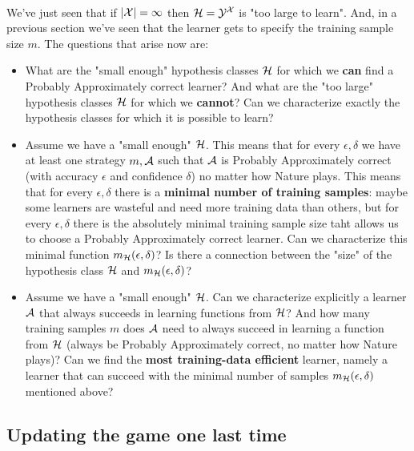 ~\\
 We've just seen that if $|\mathcal{X}|=\infty$ then $\mathcal{H}   = \mathcal{Y}^{\mathcal{X}}$ is "too large to learn".
 And, in a previous section we've seen that the learner gets to specify the training sample size $m$. 
The questions that arise now are:
\begin{itemize}
    \item What are the "small enough" hypothesis classes $\mathcal{H}$ for which we {\bf can} find a Probably Approximately correct learner?
    And what are the "too large" hypothesis classes $\mathcal{H}$ for which we {\bf cannot}? Can we characterize exactly the hypothesis classes for which it is possible to learn?
     \item Assume we have a "small enough" $\mathcal{H}$. This means that for every
       $\epsilon,\delta$ we have at least one strategy $m,\mathcal{A}$ such that $\mathcal{A}$
       is Probably Approximately correct (with accuracy $\epsilon$ and
       confidence $\delta$) no matter how Nature plays. This means that for
       every $\epsilon,\delta$ there is a {\bf minimal number of training
       samples}: maybe some learners are wasteful and need more training data
       than others, but for every $\epsilon,\delta$ there is the absolutely
       minimal training sample size taht allows us to choose a Probably Approximately correct learner. Can we characterize this minimal function 
     $m_{\mathcal{H}}(\epsilon,\delta)$? Is there a connection between the "size" of the hypothesis class $\mathcal{H}$ and
     $m_{\mathcal{H}}(\epsilon,\delta)$?
     \item Assume we have a "small enough" $\mathcal{H}$. Can we characterize explicitly a learner $\mathcal{A}$ that always succeeds in learning functions from $\mathcal{H}$? And how many training samples $m$ does $\mathcal{A}$ need to always succeed in learning a function from $\mathcal{H}$ (always be Probably Approximately correct, no matter how Nature plays)? Can we find the {\bf most training-data efficient} learner, namely a learner that can succeed with the minimal number of samples $m_{\mathcal{H}}(\epsilon,\delta)$ mentioned above?
 \end{itemize}
 
 
 \subsection{Updating the game one last time}

